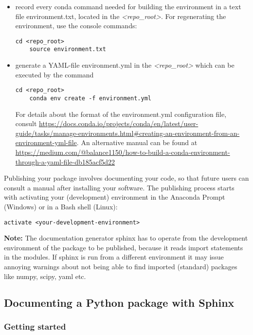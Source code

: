 \begin{itemize}
	\item record every \textsf{conda} command needed for building the environment in a text file \textsf{environment.txt}, located in the \textit{\textless repo\_root\textgreater}. For regenerating the environment, use the console commands:
\begin{lstlisting}[style=DOS]
	cd <repo_root>
	source environment.txt
\end{lstlisting}
    \item generate a YAML-file \textsf{environment.yml} in the \textit{\textless repo\_root\textgreater} which can be executed by the command
\begin{lstlisting}[style=DOS]
    cd <repo_root>
    conda env create -f environment.yml
\end{lstlisting}

    For details about the format of the \textsf{environment.yml} configuration file, consult \url{https://docs.conda.io/projects/conda/en/latest/user-guide/tasks/manage-environments.html#creating-an-environment-from-an-environment-yml-file}. An alternative manual can be found at \url{https://medium.com/@balance1150/how-to-build-a-conda-environment-through-a-yaml-file-db185acf5d22}
\end{itemize}

Publishing your package involves documenting your code, so that future users can consult a manual after installing your software. The publishing process starts with activating your (development) environment in the Anaconda Prompt (Windows) or in a Bash shell (Linux):

\begin{lstlisting}[style=DOS]
	activate <your-development-environment>
\end{lstlisting}

\textbf{Note:} The documentation generator \textsf{sphinx} has to operate from the development environment of the package to be published, because it reads import statements in the modules. If sphinx is run from a different environment it may issue annoying warnings about not being able to find imported (standard) packages like numpy, scipy, yaml etc.

\subsection{Documenting a Python package with Sphinx}

\subsubsection{Getting started}

